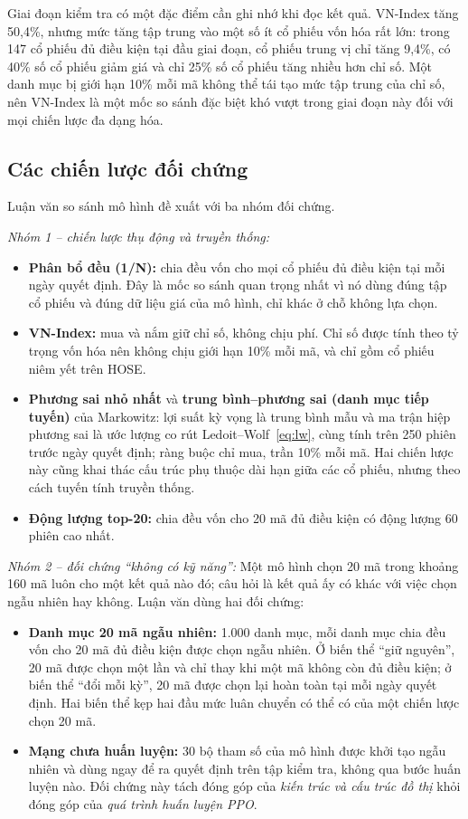 Giai đoạn kiểm tra có một đặc điểm cần ghi nhớ khi đọc kết quả. VN-Index tăng 50,4\%, nhưng mức tăng tập trung vào một số ít cổ phiếu vốn hóa rất lớn: trong 147 cổ phiếu đủ điều kiện tại đầu giai đoạn, cổ phiếu trung vị chỉ tăng 9,4\%, có 40\% số cổ phiếu giảm giá và chỉ 25\% số cổ phiếu tăng nhiều hơn chỉ số. Một danh mục bị giới hạn 10\% mỗi mã không thể tái tạo mức tập trung của chỉ số, nên VN-Index là một mốc so sánh đặc biệt khó vượt trong giai đoạn này đối với mọi chiến lược đa dạng hóa.

\subsection{Các chiến lược đối chứng}
\label{sec:baselines}

Luận văn so sánh mô hình đề xuất với ba nhóm đối chứng.

\textit{Nhóm 1 -- chiến lược thụ động và truyền thống:}
\begin{itemize}
  \item \textbf{Phân bổ đều (1/N):} chia đều vốn cho mọi cổ phiếu đủ điều kiện tại mỗi ngày quyết định. Đây là mốc so sánh quan trọng nhất vì nó dùng đúng tập cổ phiếu và đúng dữ liệu giá của mô hình, chỉ khác ở chỗ không lựa chọn.
  \item \textbf{VN-Index:} mua và nắm giữ chỉ số, không chịu phí. Chỉ số được tính theo tỷ trọng vốn hóa nên không chịu giới hạn 10\% mỗi mã, và chỉ gồm cổ phiếu niêm yết trên HOSE.
  \item \textbf{Phương sai nhỏ nhất} và \textbf{trung bình--phương sai (danh mục tiếp tuyến)} của Markowitz: lợi suất kỳ vọng là trung bình mẫu và ma trận hiệp phương sai là ước lượng co rút Ledoit--Wolf~\eqref{eq:lw}, cùng tính trên 250 phiên trước ngày quyết định; ràng buộc chỉ mua, trần 10\% mỗi mã. Hai chiến lược này cũng khai thác cấu trúc phụ thuộc dài hạn giữa các cổ phiếu, nhưng theo cách tuyến tính truyền thống.
  \item \textbf{Động lượng top-20:} chia đều vốn cho 20 mã đủ điều kiện có động lượng 60 phiên cao nhất.
\end{itemize}

\textit{Nhóm 2 -- đối chứng ``không có kỹ năng'':} Một mô hình chọn 20 mã trong khoảng 160 mã luôn cho một kết quả nào đó; câu hỏi là kết quả ấy có khác với việc chọn ngẫu nhiên hay không. Luận văn dùng hai đối chứng:
\begin{itemize}
  \item \textbf{Danh mục 20 mã ngẫu nhiên:} 1.000 danh mục, mỗi danh mục chia đều vốn cho 20 mã đủ điều kiện được chọn ngẫu nhiên. Ở biến thể ``giữ nguyên'', 20 mã được chọn một lần và chỉ thay khi một mã không còn đủ điều kiện; ở biến thể ``đổi mỗi kỳ'', 20 mã được chọn lại hoàn toàn tại mỗi ngày quyết định. Hai biến thể kẹp hai đầu mức luân chuyển có thể có của một chiến lược chọn 20 mã.
  \item \textbf{Mạng chưa huấn luyện:} 30 bộ tham số của mô hình được khởi tạo ngẫu nhiên và dùng ngay để ra quyết định trên tập kiểm tra, không qua bước huấn luyện nào. Đối chứng này tách đóng góp của \emph{kiến trúc và cấu trúc đồ thị} khỏi đóng góp của \emph{quá trình huấn luyện PPO}.
\end{itemize}

